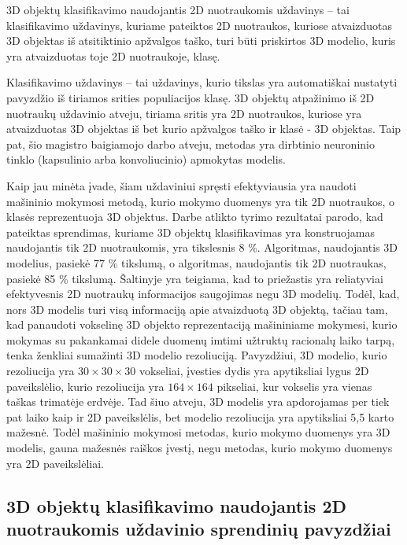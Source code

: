 
3D objektų klasifikavimo naudojantis 2D nuotraukomis uždavinys -- tai klasifikavimo uždavinys, kuriame pateiktos 2D nuotraukos, kuriose atvaizduotas 3D objektas iš atsitiktinio apžvalgos taško, turi būti priskirtos 3D modelio, kuris yra atvaizduotas toje 2D nuotraukoje, klasę.

Klasifikavimo uždavinys -- tai uždavinys, kurio tikslas yra automatiškai nustatyti pavyzdžio iš tiriamos srities populiacijos klasę. 3D objektų atpažinimo iš 2D nuotraukų uždavinio atveju, tiriama sritis yra 2D nuotraukos, kuriose yra atvaizduotas 3D objektas iš bet kurio apžvalgos taško ir klasė - 3D objektas. Taip pat, šio magistro baigiamojo darbo atveju, metodas yra dirbtinio neuroninio tinklo (kapsulinio arba konvoliucinio) apmokytas modelis.

Kaip jau minėta įvade, šiam uždaviniui spręsti efektyviausia yra naudoti mašininio mokymosi metodą, kurio mokymo duomenys yra tik 2D nuotraukos, o klasės reprezentuoja 3D objektus. Darbe \cite{dbnExp} atlikto tyrimo rezultatai parodo, kad pateiktas sprendimas, kuriame 3D objektų klasifikavimas yra konstruojamas naudojantis tik 2D nuotraukomis, yra tikslesnis 8 \%. Algoritmas, naudojantis 3D modelius, pasiekė 77 \% tikslumą, o algoritmas, naudojantis tik 2D nuotraukas, pasiekė 85 \% tikslumą. Šaltinyje \cite{cnnExp1} yra teigiama, kad to priežastis yra reliatyviai efektyvesnis 2D nuotraukų informacijos saugojimas negu 3D modelių. Todėl, kad, nors 3D modelis turi visą informaciją apie atvaizduotą 3D objektą, tačiau tam, kad panaudoti vokselinę 3D objekto reprezentaciją mašininiame mokymesi, kurio mokymas su pakankamai didele duomenų imtimi užtruktų racionalų laiko tarpą, tenka ženkliai sumažinti 3D modelio rezoliuciją. Pavyzdžiui, 3D modelio, kurio rezoliucija yra $30\times30\times30$ vokseliai, įvesties dydis yra apytiksliai lygus 2D paveikslėlio, kurio rezoliucija yra $164\times164$ pikseliai, kur vokselis yra vienas taškas trimatėje erdvėje. Tad šiuo atveju, 3D modelis yra apdorojamas per tiek pat laiko kaip ir 2D paveikslėlis, bet modelio rezoliucija yra apytiksliai 5,5 karto mažesnė. Todėl mašininio mokymosi metodas, kurio mokymo duomenys yra 3D modelis, gauna mažesnės raiškos įvestį, negu metodas, kurio mokymo duomenys yra 2D paveikslėliai.

\subsection{3D objektų klasifikavimo naudojantis 2D nuotraukomis uždavinio sprendinių pavyzdžiai}

